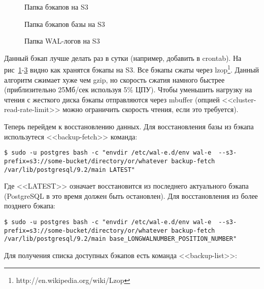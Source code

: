 \begin{figure}[h!]
  \caption{Папка бэкапов на S3}
  \label{fig:wal-e1}
\end{figure}

\begin{figure}[h!]
  \caption{Папка бэкапов базы на S3}
  \label{fig:wal-e2}
\end{figure}

\begin{figure}[h!]
  \caption{Папка WAL-логов на S3}
  \label{fig:wal-e3}
\end{figure}

Данный бэкап лучше делать раз в сутки (например, добавить в crontab). На рис~\ref{fig:wal-e1}-\ref{fig:wal-e3} видно как хранятся бэкапы на S3. Все бэкапы сжаты через lzop\footnote{http://en.wikipedia.org/wiki/Lzop}. Данный алгоритм сжимает хуже чем gzip, но скорость сжатия намного быстрее (приблизительно 25Мб/сек используя 5\% ЦПУ). Чтобы уменьшить нагрузку на чтения с жесткого диска бэкапы отправляются через mbuffer (опцией <<cluster-read-rate-limit>> можно ограничить скорость чтения, если это требуется).

Теперь перейдем к восстановлению данных. Для восстановления базы из бэкапа использутеся <<backup-fetch>> команда:

\begin{lstlisting}[label=lst:wal-e10,caption=Восстановление бэкапа базы из S3]
$ sudo -u postgres bash -c "envdir /etc/wal-e.d/env wal-e  --s3-prefix=s3://some-bucket/directory/or/whatever backup-fetch /var/lib/postgresql/9.2/main LATEST"
\end{lstlisting}

Где <<LATEST>> означает восстановится из последнего актуального бэкапа (PostgreSQL в это время должен быть остановлен). Для восстановления из более позднего бэкапа:

\begin{lstlisting}[label=lst:wal-e11,caption=Восстановление старшего бэкапа из S3]
$ sudo -u postgres bash -c "envdir /etc/wal-e.d/env wal-e  --s3-prefix=s3://some-bucket/directory/or/whatever backup-fetch /var/lib/postgresql/9.2/main base_LONGWALNUMBER_POSITION_NUMBER"
\end{lstlisting}

Для получения списка доступных бэкапов есть команда <<backup-list>>:


